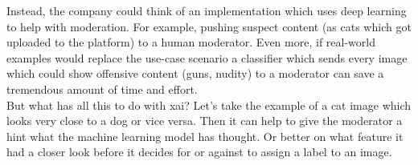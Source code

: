 Instead, the company could think of an implementation which uses deep learning to help with moderation. For example, pushing suspect content (as cats which got uploaded to the platform) to a human moderator. Even more, if real-world examples would replace the use-case scenario a classifier which sends every image which could show offensive content (guns, nudity) to a moderator can save a tremendous amount of time and effort.\\

But what has all this to do with \gls{xai}? Let's take the example of a cat image which looks very close to a dog or vice versa. Then it can help to give the moderator a hint what the machine learning model has thought. Or better on what feature it had a closer look before it decides for or against to assign a label to an image.\\

